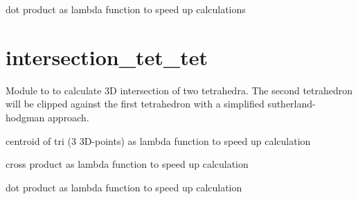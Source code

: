 \documentclass[letterpaper,10pt,english]{sphinxmanual}
\begin{document}
\begin{fulllineitems}
\label{pk_src.collision_tet_tet:pk_src.collision_tet_tet.dot}
dot product as lambda function to speed up calculations

\end{fulllineitems}



\section{intersection\_tet\_tet}
\label{pk_src.intersection_tet_tet:intersection-tet-tet}\label{pk_src.intersection_tet_tet::doc}\label{pk_src.intersection_tet_tet:id1}
{\hyperref[index:sec\string-misc]{}}
\label{pk_src.intersection_tet_tet:module-pk_src.intersection_tet_tet}
Module to to calculate 3D intersection of two tetrahedra.
The second tetrahedron will be clipped against the first tetrahedron with a simplified sutherland-hodgman approach.

\begin{fulllineitems}
\label{pk_src.intersection_tet_tet:pk_src.intersection_tet_tet.centroid_tri}
centroid of tri (3 3D-points) as lambda function to speed up calculation

\end{fulllineitems}


\begin{fulllineitems}
\label{pk_src.intersection_tet_tet:pk_src.intersection_tet_tet.cross}
cross product as lambda function to speed up calculation

\end{fulllineitems}


\begin{fulllineitems}
\label{pk_src.intersection_tet_tet:pk_src.intersection_tet_tet.dot}
dot product as lambda function to speed up calculation

\end{fulllineitems}
\end{document}
